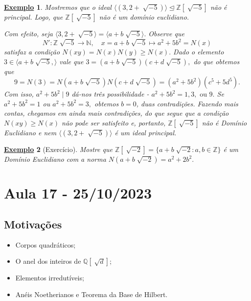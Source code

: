 \documentclass{article}
\newtheorem{example}{\underline{Exemplo}}
\begin{document}
\begin{example}
  Mostremos que o ideal \(\langle (3, 2 + \sqrt[]{-5}) \rangle \trianglelefteq{\mathbb{Z}[\sqrt[]{-5}]}\) não é principal. Logo, que
  \(\mathbb{Z}[\sqrt[]{-5}]\) não é um domínio euclidiano.

  Com efeito, seja \(\langle 3, 2 + \sqrt[]{-5} \rangle = \langle a + b\sqrt[]{-5} \rangle.\) Observe que 
  \[
    N':\mathbb{Z}\sqrt[]{-5}\rightarrow \mathbb{N},\quad x = a+b\sqrt[]{-5}\mapsto a^{2}+5b^{2} = N(x)
  \]
  satisfaz a condição \(N(xy) = N(x)N(y)\geq N(x).\) Dado o elemento \(3\in \langle a + b\sqrt[]{-5}, \rangle\)
  vale que \(3 = (a+b\sqrt[]{-5})(c+d\sqrt[]{-5}),\) do que obtemos que 
  \[
    9 = N(3) = N(a+b\sqrt[]{-5})N(c+d\sqrt[]{-5}) = (a^{2}+5b^{2})(c^{5}+5d^{5}).
  \]
  Com isso, \(a^{2}+5b^{2}\mid 9\) dá-nos três possibilidade - \(a^{2} + 5b^{2} = 1, 3,\text{ ou }9.\)
  Se \(a^{2} + 5b^{2} = 1\) ou \(a^{2} + 5b^{2} = 3,\) obtemos \(b = 0\), duas contradições. Fazendo mais contas,
  chegamos em ainda mais contradições, do que segue que a condição \(N(xy)\geq N(x)\) não pode ser satisfeito e, portanto,
  \(\mathbb{Z}[\sqrt[]{-5}]\) não é Domínio Euclidiano e nem \(\langle (3, 2+\sqrt[]{-5}) \rangle\) é um ideal principal.
\end{example}
\begin{example}[Exercício]
  Mostre que \(\mathbb{Z}[\sqrt[]{-2}] = \{a + b\sqrt[]{-2}: a, b\in \mathbb{Z}\}\) é um Domínio
  Euclidiano com a norma \(N(a+b\sqrt[]{-2}) = a^{2} + 2b^{2}.\)
\end{example}
\newpage

\section{Aula 17 - 25/10/2023}
\subsection{Motivações} 
\begin{itemize}
  \item Corpos quadráticos;
  \item O anel dos inteiros de \(\mathbb{Q}[\sqrt[]{d}]\);
  \item Elementos irredutíveis;
  \item Anéis Noetherianos e Teorema da Base de Hilbert.
\end{itemize}
\end{document}
